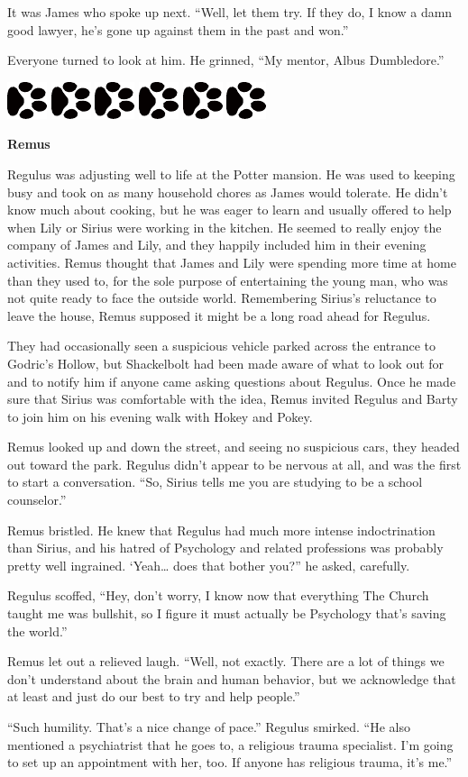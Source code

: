 \documentclass[12pt,twoside,openright]{memoir}
\newcommand{\dogPrintRule}{	
	\begin{center}
		\hspace{.5em}
		\includegraphics[angle=60]{dogprint.pdf}
		\hspace{.5em}
		\includegraphics[angle=120]{dogprint.pdf}
		\hspace{.5em}
		\includegraphics[angle=60]{dogprint.pdf}
		\hspace{.5em}
		\includegraphics[angle=120]{dogprint.pdf}
		\hspace{.5em}
		\includegraphics[angle=60]{dogprint.pdf}
		\hspace{.5em}
		\includegraphics[angle=120]{dogprint.pdf}
		\hspace{.5em}
	\end{center}
}
\begin{document}
It was James who spoke up next. ``Well, let them try. If they do, I know a damn good lawyer, he's gone up against them in the past and won.''

Everyone turned to look at him. He grinned, ``My mentor, Albus Dumbledore.''

\dogPrintRule

\textbf{Remus} 

Regulus was adjusting well to life at the Potter mansion. He was used to keeping busy and took on as many household chores as James would tolerate. He didn't know much about cooking, but he was eager to learn and usually offered to help when Lily or Sirius were working in the kitchen. He seemed to really enjoy the company of James and Lily, and they happily included him in their evening activities. Remus thought that James and Lily were spending more time at home than they used to, for the sole purpose of entertaining the young man, who was not quite ready to face the outside world. Remembering Sirius's reluctance to leave the house, Remus supposed it might be a long road ahead for Regulus. 

They had occasionally seen a suspicious vehicle parked across the entrance to Godric's Hollow, but Shackelbolt had been made aware of what to look out for and to notify him if anyone came asking questions about Regulus. Once he made sure that Sirius was comfortable with the idea, Remus invited Regulus and Barty to join him on his evening walk with Hokey and Pokey.

Remus looked up and down the street, and seeing no suspicious cars, they headed out toward the park. Regulus didn't appear to be nervous at all, and was the first to start a conversation. ``So, Sirius tells me you are studying to be a school counselor.''

Remus bristled. He knew that Regulus had much more intense indoctrination than Sirius, and his hatred of Psychology and related professions was probably pretty well ingrained. ‘Yeah… does that bother you?'' he asked, carefully. 

Regulus scoffed, ``Hey, don't worry, I know now that everything The Church taught me was bullshit, so I figure it must actually be Psychology that's saving the world.''

Remus let out a relieved laugh. ``Well, not exactly. There are a lot of things we don't understand about the brain and human behavior, but we acknowledge that at least and just do our best to try and help people.''

``Such humility. That's a nice change of pace.'' Regulus smirked. ``He also mentioned a psychiatrist that he goes to, a religious trauma specialist. I'm going to set up an appointment with her, too. If anyone has religious trauma, it's me.'' 
\end{document}
